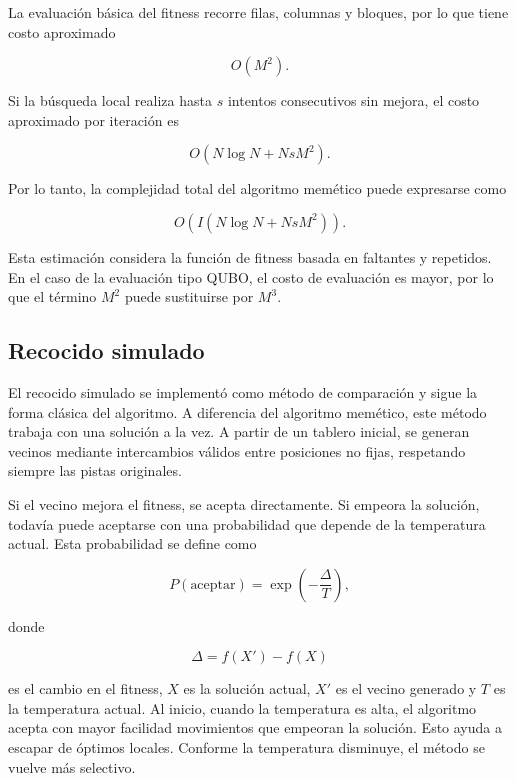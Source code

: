 \documentclass{article}
\begin{document}
La evaluación básica del fitness recorre filas, columnas y bloques, por lo que tiene costo aproximado

\[
O(M^2).
\]

Si la búsqueda local realiza hasta \(s\) intentos consecutivos sin mejora, el costo aproximado por iteración es

\[
O(N\log N + NsM^2).
\]

Por lo tanto, la complejidad total del algoritmo memético puede expresarse como

\[
O\left(I(N\log N + NsM^2)\right).
\]

Esta estimación considera la función de fitness basada en faltantes y repetidos. En el caso de la evaluación tipo QUBO, el costo de evaluación es mayor, por lo que el término \(M^2\) puede sustituirse por \(M^3\).

\subsection{Recocido simulado}

El recocido simulado se implementó como método de comparación y sigue la forma clásica del algoritmo. A diferencia del algoritmo memético, este método trabaja con una solución a la vez. A partir de un tablero inicial, se generan vecinos mediante intercambios válidos entre posiciones no fijas, respetando siempre las pistas originales.

Si el vecino mejora el fitness, se acepta directamente. Si empeora la solución, todavía puede aceptarse con una probabilidad que depende de la temperatura actual. Esta probabilidad se define como

\[
P(\text{aceptar}) = \exp\left(-\frac{\Delta}{T}\right),
\]

donde

\[
\Delta = f(X') - f(X)
\]

es el cambio en el fitness, \(X\) es la solución actual, \(X'\) es el vecino generado y \(T\) es la temperatura actual. Al inicio, cuando la temperatura es alta, el algoritmo acepta con mayor facilidad movimientos que empeoran la solución. Esto ayuda a escapar de óptimos locales. Conforme la temperatura disminuye, el método se vuelve más selectivo.
\end{document}
